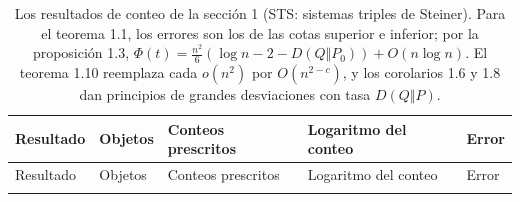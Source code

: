 \documentclass[spanish,11pt,a4paper]{article}
\begin{document}
\begin{longtable}[]{@{}
  >{\raggedright\arraybackslash}p{}
  >{\raggedright\arraybackslash}p{}
  >{\raggedright\arraybackslash}p{}
  >{\raggedright\arraybackslash}p{}
  >{\raggedright\arraybackslash}p{}@{}}
\caption{Los resultados de conteo de la sección 1 (STS: sistemas triples de Steiner). Para el teorema 1.1, los errores son los de las cotas superior e inferior; por la proposición 1.3, \(\Phi(t)=\tfrac{n^2}{6}(\log n-2-D(Q\Vert P_0))+O(n\log n)\). El teorema 1.10 reemplaza cada \(o(n^2)\) por \(O(n^{2-c})\), y los corolarios 1.6 y 1.8 dan principios de grandes desviaciones con tasa \(D(Q\Vert P)\).}\tabularnewline
\toprule\noalign{}
\begin{minipage}[b]{\linewidth}\raggedright
Resultado
\end{minipage} & \begin{minipage}[b]{\linewidth}\raggedright
Objetos
\end{minipage} & \begin{minipage}[b]{\linewidth}\raggedright
Conteos prescritos
\end{minipage} & \begin{minipage}[b]{\linewidth}\raggedright
Logaritmo del conteo
\end{minipage} & \begin{minipage}[b]{\linewidth}\raggedright
Error
\end{minipage} \\
\midrule\noalign{}
\endfirsthead
\toprule\noalign{}
\begin{minipage}[b]{\linewidth}\raggedright
Resultado
\end{minipage} & \begin{minipage}[b]{\linewidth}\raggedright
Objetos
\end{minipage} & \begin{minipage}[b]{\linewidth}\raggedright
Conteos prescritos
\end{minipage} & \begin{minipage}[b]{\linewidth}\raggedright
Logaritmo del conteo
\end{minipage} & \begin{minipage}[b]{\linewidth}\raggedright
Error
\end{minipage} \\
\midrule\noalign{}
\endhead
\bottomrule\noalign{}

\end{longtable}
\end{document}

